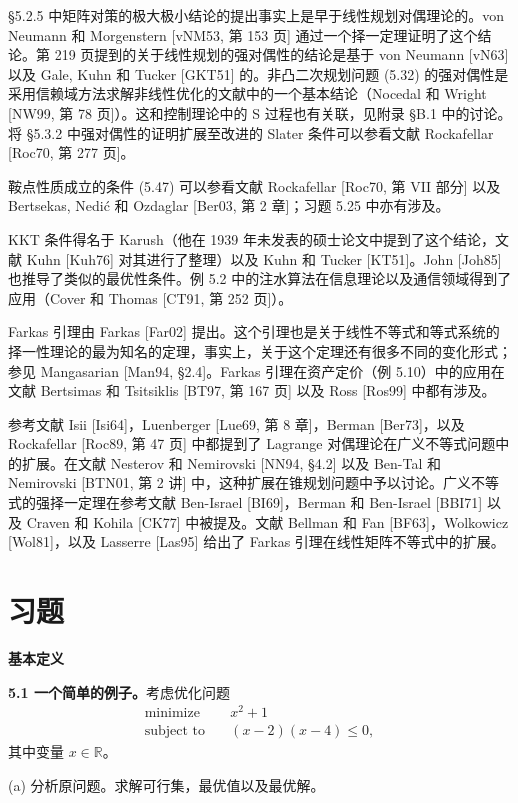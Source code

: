\documentclass[UTF8, 12pt, fontset=fandol, oneside]{ctexart}
\begin{document}
§5.2.5 中矩阵对策的极大极小结论的提出事实上是早于线性规划对偶理论的。von Neumann 和 Morgenstern [vNM53, 第 153 页] 通过一个择一定理证明了这个结论。第 219 页提到的关于线性规划的强对偶性的结论是基于 von Neumann [vN63] 以及 Gale, Kuhn 和 Tucker [GKT51] 的。非凸二次规划问题 (5.32) 的强对偶性是采用信赖域方法求解非线性优化的文献中的一个基本结论（Nocedal 和 Wright [NW99, 第 78 页]）。这和控制理论中的 S 过程也有关联，见附录 §B.1 中的讨论。将 §5.3.2 中强对偶性的证明扩展至改进的 Slater 条件可以参看文献 Rockafellar [Roc70, 第 277 页]。

鞍点性质成立的条件 (5.47) 可以参看文献 Rockafellar [Roc70, 第 VII 部分] 以及 Bertsekas, Nedić 和 Ozdaglar [Ber03, 第 2 章]；习题 5.25 中亦有涉及。

KKT 条件得名于 Karush（他在 1939 年未发表的硕士论文中提到了这个结论，文献 Kuhn [Kuh76] 对其进行了整理）以及 Kuhn 和 Tucker [KT51]。John [Joh85] 也推导了类似的最优性条件。例 5.2 中的注水算法在信息理论以及通信领域得到了应用（Cover 和 Thomas [CT91, 第 252 页]）。

Farkas 引理由 Farkas [Far02] 提出。这个引理也是关于线性不等式和等式系统的择一性理论的最为知名的定理，事实上，关于这个定理还有很多不同的变化形式；参见 Mangasarian [Man94, §2.4]。Farkas 引理在资产定价（例 5.10）中的应用在文献 Bertsimas 和 Tsitsiklis [BT97, 第 167 页] 以及 Ross [Ros99] 中都有涉及。

参考文献 Isii [Isi64]，Luenberger [Lue69, 第 8 章]，Berman [Ber73]，以及 Rockafellar [Roc89, 第 47 页] 中都提到了 Lagrange 对偶理论在广义不等式问题中的扩展。在文献 Nesterov 和 Nemirovski [NN94, §4.2] 以及 Ben-Tal 和 Nemirovski [BTN01, 第 2 讲] 中，这种扩展在锥规划问题中予以讨论。广义不等式的强择一定理在参考文献 Ben-Israel [BI69]，Berman 和 Ben-Israel [BBI71] 以及 Craven 和 Kohila [CK77] 中被提及。文献 Bellman 和 Fan [BF63]，Wolkowicz [Wol81]，以及 Lasserre [Las95] 给出了 Farkas 引理在线性矩阵不等式中的扩展。

\section*{习题}

\noindent\textbf{基本定义}

\noindent\textbf{5.1 一个简单的例子。}\quad 考虑优化问题
\[
\begin{aligned}
\text{minimize}\quad & x^2+1\\
\text{subject to}\quad & (x-2)(x-4)\leq 0,
\end{aligned}
\]
其中变量 $x\in\mathbb{R}$。

(a) 分析原问题。求解可行集，最优值以及最优解。
\end{document}
